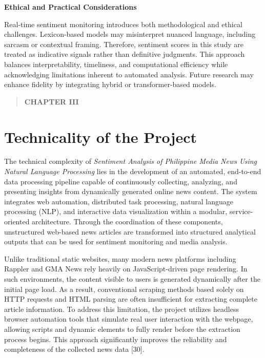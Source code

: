 \textbf{Ethical and Practical Considerations}

Real-time sentiment monitoring introduces both methodological and ethical challenges. Lexicon-based models may misinterpret nuanced language, including sarcasm or contextual framing. Therefore, sentiment scores in this study are treated as indicative signals rather than definitive judgments. This approach balances interpretability, timeliness, and computational efficiency while acknowledging limitations inherent to automated analysis. Future research may enhance fidelity by integrating hybrid or transformer-based models.

\begin{quote}
\textbf{CHAPTER III}
\end{quote}

\section{\texorpdfstring{\textbf{Technicality of the Project}}{Technicality of the Project}}\label{technicality-of-the-project}

The technical complexity of \emph{Sentiment Analysis of Philippine Media News Using Natural Language Processing} lies in the development of an automated, end-to-end data processing pipeline capable of continuously collecting, analyzing, and presenting insights from dynamically generated online news content. The system integrates web automation, distributed task processing, natural language processing (NLP), and interactive data visualization within a modular, service-oriented architecture. Through the coordination of these components, unstructured web-based news articles are transformed into structured analytical outputs that can be used for sentiment monitoring and media analysis.

Unlike traditional static websites, many modern news platforms including Rappler and GMA News rely heavily on JavaScript-driven page rendering. In such environments, the content visible to users is generated dynamically after the initial page load. As a result, conventional scraping methods based solely on HTTP requests and HTML parsing are often insufficient for extracting complete article information. To address this limitation, the project utilizes headless browser automation tools that simulate real user interaction with the webpage, allowing scripts and dynamic elements to fully render before the extraction process begins. This approach significantly improves the reliability and completeness of the collected news data {[}30{]}.

